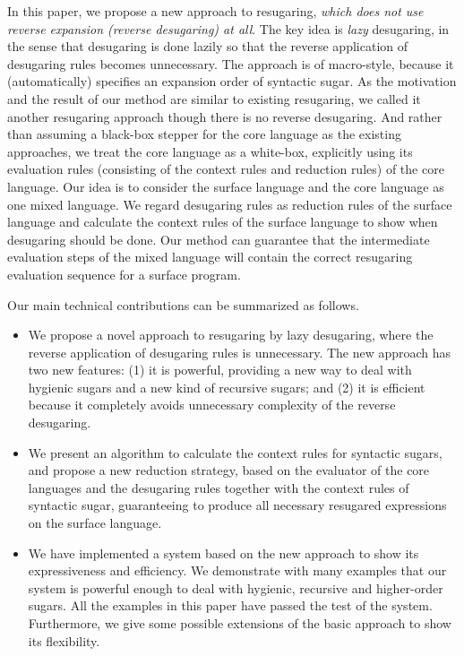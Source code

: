 
\label{mark:mention}
In this paper, we propose a new approach to resugaring, \emph{which does not use reverse expansion (reverse desugaring) at all}.
The key idea is \emph{lazy} desugaring, in the sense that desugaring is done lazily  so that the reverse application of desugaring rules becomes unnecessary. The approach is of macro-style, because it (automatically) specifies an expansion order of syntactic sugar. As the motivation and the result of our method are similar to existing resugaring, we called it another resugaring approach though there is no reverse desugaring. And rather than assuming a black-box stepper for the core language as the existing approaches, we treat the core language as a white-box, explicitly using its evaluation rules (consisting of the context rules and reduction rules) of the core language. Our idea is to consider the surface language and the core language as one mixed language. We regard desugaring rules as reduction rules of the surface language and calculate the context rules of the surface language to show when desugaring should be done. Our method can guarantee that the intermediate evaluation steps of the mixed language will contain the correct resugaring evaluation sequence for a surface program.

Our main technical contributions can be summarized as follows.
\begin{itemize}
\item We propose a novel approach to resugaring by lazy desugaring, where the reverse application of desugaring rules is unnecessary. The new approach has two new features: (1) it is powerful, providing a new way to deal with hygienic sugars and a new kind of recursive sugars; and (2) it is efficient because it completely avoids unnecessary complexity of the reverse desugaring.

\item We present an algorithm to calculate the context rules for syntactic sugars, and propose a new reduction strategy, based on the evaluator of the core languages and the desugaring rules together with the context rules of syntactic sugar, guaranteeing to produce all necessary resugared expressions on the surface language.

\item We have implemented a system based on the new approach to show its expressiveness and efficiency. We demonstrate with many examples that our system is powerful enough to deal with hygienic, recursive and higher-order sugars. All the examples in this paper have passed the test of the system. Furthermore, we give some possible extensions of the basic approach to show its flexibility.


\end{itemize}


